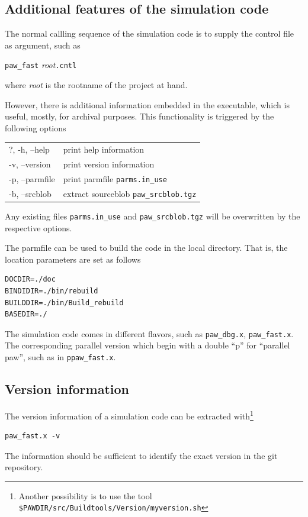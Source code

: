 \documentclass[final,12pt,makeidx,DIV=calc]{article}
\begin{document}
{{{{{{%
\subsection{Additional features of the simulation code}
The normal callling sequence of the simulation code is to supply the
control file as argument, such as 
\begin{center}
\verb|paw_fast| \textit{root}\verb|.cntl|
\end{center}
where \textit{root} is the rootname of the project at hand.

However, there is additional information embedded in the executable,
which is useful, mostly, for archival purposes. This functionality is
triggered by the following options
\begin{center}
\begin{tabular}{ll}
?, -h, --help & print help information\\
-v, --version & print version information\\
-p, --parmfile & print parmfile \verb|parms.in_use|\\
-b, --srcblob  & extract sourceblob \verb|paw_srcblob.tgz| \\
\end{tabular}
\end{center}
Any existing files \verb|parms.in_use| and \verb|paw_srcblob.tgz| will
be overwritten by the respective options.

The parmfile can be used to build the code in the local
directory. That is, the location  parameters are set as follows
\begin{verbatim}
DOCDIR=./doc
BINDIDIR=./bin/rebuild
BUILDDIR=./bin/Build_rebuild
BASEDIR=./
\end{verbatim}


The simulation code comes in different flavors, such as
\verb|paw_dbg.x|, \verb|paw_fast.x|. The corresponding parallel
version which begin with a double ``p'' for ``parallel paw'', such as
in \verb|ppaw_fast.x|.



\subsection{Version information}
The version information of a simulation code can be extracted
with\footnote{Another possibility is to use the tool
\texttt{\${PAWDIR}/src/Buildtools/Version/myversion.sh}}
\begin{verbatim}
paw_fast.x -v
\end{verbatim}
The information should be sufficient to identify the exact version in
the git repository.


}}}}}}
\end{document}
